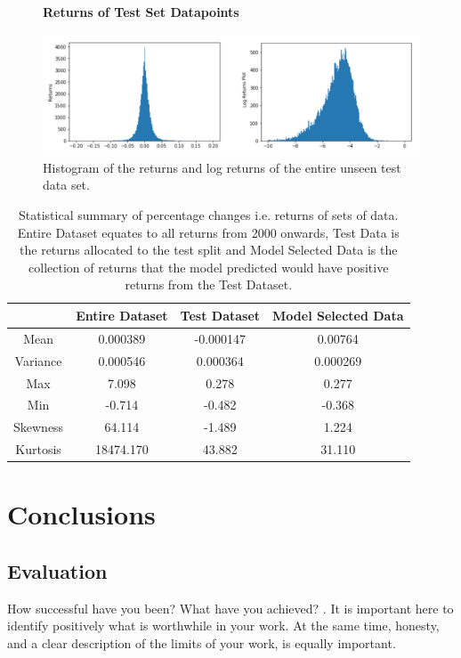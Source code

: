 \documentclass[10pt,onecolumn,letterpaper]{article}
\newcommand*{\figuretitle}[1]{%
    {\centering%
    \textbf{#1}%
    \par\medskip}%
}
\begin{document}
\begin{figure}[!hbt!]
\figuretitle{Returns of Test Set Datapoints} 
\centering
\includegraphics[width=16.5cm]{test_returns.png}
\caption{Histogram of the returns and log returns of the entire unseen test data set.}
\end{figure}


\begin{table}[hbt!]
\begin{center}
\begin{tabular}{c|c|c|c}
 & Entire Dataset & Test Dataset & Model Selected Data\\
\hline
Mean & 0.000389 & -0.000147 & 0.00764\\
\hline
Variance & 0.000546 & 0.000364 & 0.000269\\
\hline
Max & 7.098 & 0.278 & 0.277\\
\hline
Min & -0.714 & -0.482 & -0.368\\
\hline
Skewness & 64.114 & -1.489 & 1.224\\
\hline
Kurtosis & 18474.170 & 43.882 & 31.110\\
\end{tabular}
\end{center}
\caption{Statistical summary of percentage changes i.e. returns of sets of data. Entire Dataset equates to all returns from 2000 onwards, Test Data is the returns allocated to the test split and Model Selected Data is the collection of returns that the model predicted would have positive returns from the Test Dataset.}
\end{table}



\newpage

\section{Conclusions}

\subsection{Evaluation} \label{evaluation}
\iffalse
How successful have you been? What have you achieved? . It is important here to identify positively what is worthwhile in your work. At the same time, honesty, and a clear description of the limits of your work, is equally important.
\end{document}
